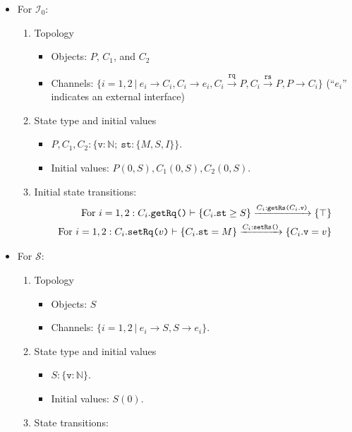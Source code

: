 \documentclass[format=manuscript]{acmart}
\begin{document}
\begin{itemize}
\item For $\mathcal{I}_0$:
  \begin{enumerate}
  \item Topology
    \begin{itemize}
    \item Objects: $P$, $C_1$, and $C_2$
    \item Channels: $\{ i = 1,2\ |\ e_i \rightarrow C_i, C_i \rightarrow e_i,
      C_i \xrightarrow{\texttt{rq}} P, C_i \xrightarrow{\texttt{rs}} P, P
      \rightarrow C_i \}$ (``$e_i$'' indicates an external interface)
    \end{itemize}
  \item State type and initial values
    \begin{itemize}
    \item $P, C_1, C_2: \{ \texttt{v}: \mathbb{N};\ \texttt{st}: \{M, S, I\} \}$.
    \item Initial values: $P(0, S), C_1(0, S), C_2(0, S)$.
    \end{itemize}
  \item Initial state transitions:
    \begin{eqnarray}
      \textrm{For}\ i=1,2: C_i.\texttt{getRq()}\vdash \{ C_i.\texttt{st} \geq S \} \xrightarrow{C_i:\texttt{getRs(}C_i.\texttt{v}\texttt{)}} \{ \top \} \label{trs1} \\
      \textrm{For}\ i=1,2: C_i.\texttt{setRq(}v\texttt{)}\vdash \{ C_i.\texttt{st} = M \} \xrightarrow{C_i:\texttt{setRs()}} \{ C_i.\texttt{v} = v \} \label{trs2}
    \end{eqnarray}
  \end{enumerate}
\item For $\mathcal{S}$:
  \begin{enumerate}
  \item Topology
    \begin{itemize}
    \item Objects: $S$
    \item Channels: $\{ i = 1,2\ |\ e_i \rightarrow S, S \rightarrow e_i \}$.
    \end{itemize}
  \item State type and initial values
    \begin{itemize}
    \item $S: \{ \texttt{v}: \mathbb{N} \}$.
    \item Initial values: $S(0)$.
    \end{itemize}
  \item State transitions:
    \begin{eqnarray}

\end{eqnarray}
\end{enumerate}
\end{itemize}
\end{document}
